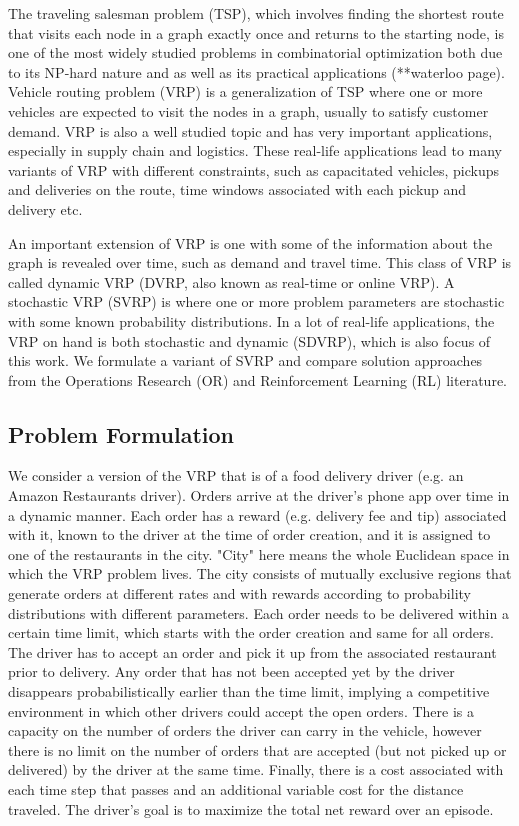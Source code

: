 \documentclass{article}
\begin{document}
The traveling salesman problem (TSP), which involves finding the shortest route that visits each node in a graph exactly once and returns to the starting node, is one of the most widely studied problems in combinatorial optimization both due to its NP-hard nature and as well as its practical applications (**waterloo page). Vehicle routing problem (VRP) is a generalization of TSP where one or more vehicles are expected to visit the nodes in a graph, usually to satisfy customer demand. VRP is also a well studied topic and has very important applications, especially in supply chain and logistics. These real-life applications lead to many variants of VRP with different constraints, such as  capacitated vehicles, pickups and deliveries on the route, time windows associated with each pickup and delivery etc. 

An important extension of VRP is one with some of the information about the graph is revealed over time, such as demand and travel time. This class of VRP is called dynamic VRP (DVRP, also known as real-time or online VRP). A stochastic VRP (SVRP) is where one or more  problem parameters are stochastic with some known probability distributions. In a lot of real-life applications, the VRP on hand is both stochastic and dynamic (SDVRP), which is also focus of this work. We formulate a variant of SVRP and compare solution approaches from the Operations Research (OR) and Reinforcement Learning (RL) literature.

\subsection{Problem Formulation}
\label{sec_vrp_pf}
We consider a version of the VRP that is of a food delivery driver (e.g. an Amazon Restaurants driver). Orders arrive at the driver's phone app over time in a dynamic manner. Each order has a reward (e.g. delivery fee and tip) associated with it, known to the driver at the time of order creation, and it is assigned to one of the restaurants in the city. "City" here means the whole Euclidean space in which the VRP problem lives. The city consists of mutually exclusive regions that generate orders at different rates and with rewards according to probability distributions with different parameters. Each order needs to be delivered within a certain time limit, which starts with the order creation and same for all orders. The driver has to accept an order and pick it up from the associated restaurant prior to delivery. Any order that has not been accepted yet by the driver disappears probabilistically earlier than the time limit, implying a competitive environment in which other drivers could accept the open orders. There is a capacity on the number of orders the driver can carry in the vehicle, however there is no limit on the number of orders that are accepted (but not picked up or delivered) by the driver at the same time. Finally, there is a cost associated with each time step that passes and an additional variable cost for the distance traveled. The driver's goal is to maximize the total net reward over an episode.
\end{document}
